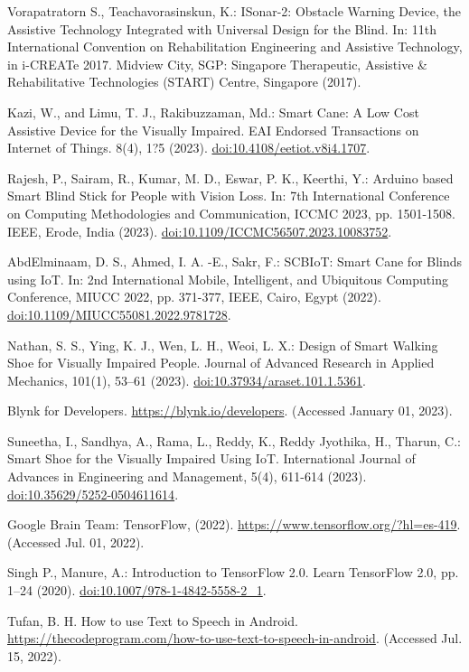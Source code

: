 \documentclass{svproc}
\begin{document}
\begin{thebibliography}{6}
Vorapatratorn S., Teachavorasinskun, K.: ISonar-2: Obstacle Warning Device, the
Assistive Technology Integrated with Universal Design for the Blind. In: 11th International
Convention on Rehabilitation Engineering and Assistive Technology, in i-CREATe 2017. Midview City, SGP: Singapore Therapeutic, Assistive \& Rehabilitative Technologies (START) Centre, Singapore (2017).

Kazi, W., and Limu, T. J., Rakibuzzaman, Md.: Smart Cane: A Low Cost Assistive
Device for the Visually Impaired. EAI Endorsed Transactions on Internet of Things.
8(4), 1?5 (2023). \url{doi:10.4108/eetiot.v8i4.1707}.

Rajesh, P., Sairam, R., Kumar, M. D., Eswar, P. K., Keerthi, Y.: Arduino based
Smart Blind Stick for People with Vision Loss. In: 7th International Conference
on Computing Methodologies and Communication, ICCMC 2023, pp. 1501-1508.
IEEE, Erode, India (2023). \url{doi:10.1109/ICCMC56507.2023.10083752}.

AbdElminaam, D. S., Ahmed, I. A. -E., Sakr, F.: SCBIoT: Smart Cane for Blinds
using IoT. In: 2nd International Mobile, Intelligent, and Ubiquitous Computing
Conference, MIUCC 2022, pp. 371-377, IEEE, Cairo, Egypt (2022). \url{doi:10.1109/MIUCC55081.2022.9781728}.

Nathan, S. S., Ying, K. J., Wen, L. H., Weoi, L. X.: Design of Smart Walking Shoe
for Visually Impaired People. Journal of Advanced Research in Applied Mechanics,
101(1), 53–61 (2023). \url{doi:10.37934/araset.101.1.5361}.

Blynk for Developers. \url{https://blynk.io/developers}. (Accessed January 01, 2023).

Suneetha, I., Sandhya, A., Rama, L., Reddy, K., Reddy Jyothika, H., Tharun,
C.: Smart Shoe for the Visually Impaired Using IoT. International Journal of
Advances in Engineering and Management, 5(4), 611-614 (2023). \url{doi:10.35629/5252-0504611614}.

Google Brain Team: TensorFlow, (2022). \url{https://www.tensorflow.org/?hl=es-419}. (Accessed Jul. 01, 2022).

Singh P., Manure, A.: Introduction to TensorFlow 2.0. Learn TensorFlow 2.0, pp.
1–24 (2020). \url{doi:10.1007/978-1-4842-5558-2_1}.

Tufan, B. H. How to use Text to Speech in Android.  \url{https://thecodeprogram.com/how-to-use-text-to-speech-in-android}. (Accessed Jul. 15,
2022).


\end{thebibliography}
\end{document}
